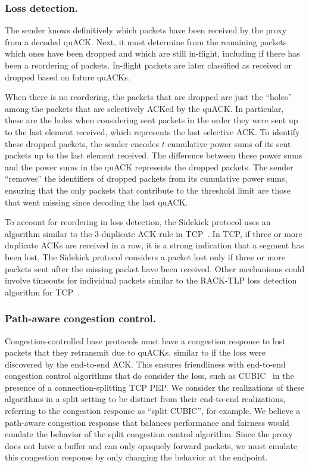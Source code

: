 \subsubsection{Loss detection.}

The sender knows definitively which packets have been received by the proxy from
a decoded quACK. Next, it must determine from the remaining packets which ones
have been dropped and which are still in-flight, including if there has been a
reordering of packets. In-flight packets are later classified as received or
dropped based on future quACKs.

When there is no reordering, the packets that are dropped are just the ``holes''
among the packets that are selectively ACKed by the quACK. In particular, these
are the holes when considering sent packets in the order they were sent up to
the last element received, which represents the last selective ACK. To identify
these dropped packets, the sender encodes $t$ cumulative power sums of its sent
packets up to the last element received. The difference between these power
sums and the power sums in the quACK represents the dropped packets. The sender
``removes'' the identifiers of dropped packets from its cumulative power sums,
ensuring that the only packets that contribute to the threshold limit are those
that went missing since decoding the last quACK.

To account for reordering in loss detection, the Sidekick protocol uses an
algorithm similar to the 3-duplicate ACK rule in
TCP~\cite{rfc5681tcp,rfc2001tcp}. In TCP, if three or more duplicate ACKs are
received in a row, it is a strong indication that a segment has been lost. The
Sidekick protocol considers a packet lost only if three or more packets sent
after the missing packet have been received. Other mechanisms could involve
timeouts for individual packets similar to the RACK-TLP loss detection
algorithm for TCP~\cite{rfc8985}.


\subsubsection{Path-aware congestion control.}

Congestion-controlled base protocols must have a congestion response to lost
packets that they retransmit due to quACKs, similar to if the loss were
discovered by the end-to-end ACK.
This ensures friendliness with end-to-end congestion control algorithms that do
consider the loss, such as CUBIC~\cite{ha2008cubic} in the presence of a
connection-splitting TCP PEP.
We consider the realizations of these algorithms in a split setting to be
distinct from their end-to-end realizations, referring to the congestion
response as ``split CUBIC'', for example. We believe a path-aware congestion
response that balances performance and fairness would emulate the behavior of
the split congestion control algorithm. Since the proxy does not have a buffer
and can only opaquely forward packets, we must emulate this congestion response
by only changing the behavior at the endpoint.

